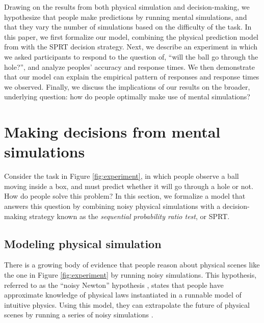 \documentclass[10pt,letterpaper]{article}
\begin{document}
Drawing on the results from both physical simulation and decision-making, we hypothesize that people make predictions by running mental simulations, and that they vary the number of simulations based on the difficulty of the task.
In this paper, we first formalize our model, combining the physical prediction model from  with the SPRT decision strategy. 
Next, we describe an experiment in which we asked participants to respond to the question of, ``will the ball go through the hole?'', and analyze peoples' accuracy and response times. 
We then demonstrate that our model can explain the empirical pattern of responses and response times we observed. 
Finally, we discuss the implications of our results on the broader, underlying question: how do people optimally make use of mental simulations?

\section{Making decisions from mental simulations}

Consider the task in Figure \ref{fig:experiment}, in which people observe a ball moving inside a box, and must predict whether it will go through a hole or not.
How do people solve this problem?
In this section, we formalize a model that answers this question by combining noisy physical simulations with a decision-making strategy known as the \emph{sequential probability ratio test}, or SPRT.

\subsection{Modeling physical simulation}

There is a growing body of evidence that people reason about physical scenes like the one in Figure \ref{fig:experiment} by running noisy simulations.
This hypothesis, referred to as the ``noisy Newton'' hypothesis \cite{Sanborn2013}, states that people have approximate knowledge of physical laws instantiated in a runnable model of intuitive physics.
Using this model, they can extrapolate the future of physical scenes by running a series of noisy simulations \cite{Smith:2013fc,Battaglia2013,Smith:2013ug,Smith:2013th,Smith:2014tx,Ullman:2014ut,Hamrick:2015}.
\end{document}
